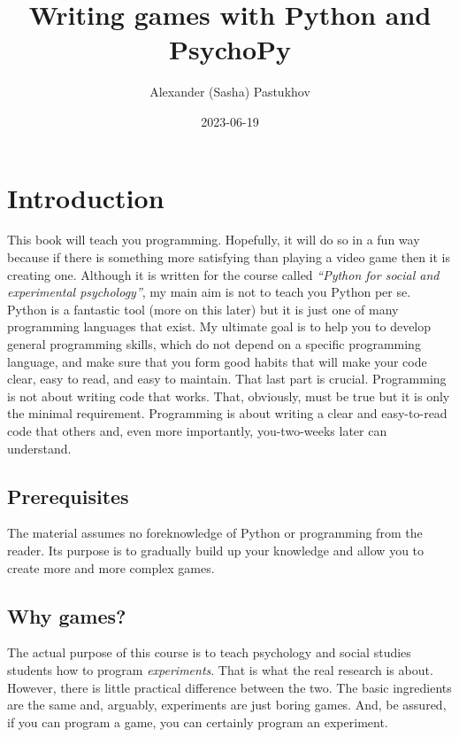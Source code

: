 \documentclass[
]{book}
\title{Writing games with Python and PsychoPy}
\author{Alexander (Sasha) Pastukhov}
\date{2023-06-19}
\begin{document}
\maketitle

{
\setcounter{tocdepth}{1}
\tableofcontents
}
\hypertarget{intro}{%
\chapter{Introduction}\label{intro}}

This book will teach you programming. Hopefully, it will do so in a fun way because if there is something more satisfying than playing a video game then it is creating one. Although it is written for the course called \emph{``Python for social and experimental psychology''}, my main aim is not to teach you Python per se. Python is a fantastic tool (more on this later) but it is just one of many programming languages that exist. My ultimate goal is to help you to develop general programming skills, which do not depend on a specific programming language, and make sure that you form good habits that will make your code clear, easy to read, and easy to maintain. That last part is crucial. Programming is not about writing code that works. That, obviously, must be true but it is only the minimal requirement. Programming is about writing a clear and easy-to-read code that others and, even more importantly, you-two-weeks later can understand.

\hypertarget{prerequisites}{%
\section{Prerequisites}\label{prerequisites}}

The material assumes no foreknowledge of Python or programming from the reader. Its purpose is to gradually build up your knowledge and allow you to create more and more complex games.

\hypertarget{why-games}{%
\section{Why games?}\label{why-games}}

The actual purpose of this course is to teach psychology and social studies students how to program \emph{experiments}. That is what the real research is about. However, there is little practical difference between the two. The basic ingredients are the same and, arguably, experiments are just boring games. And, be assured, if you can program a game, you can certainly program an experiment.
\end{document}
